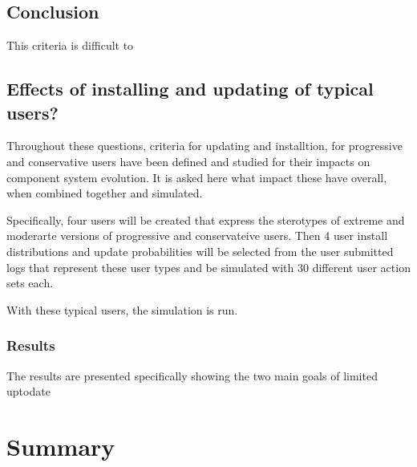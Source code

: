 \subsection{Conclusion}
This criteria is difficult to 

\subsection{Effects of installing and updating of typical users?}
Throughout these questions, criteria for updating and installtion, for progressive and conservative users have been defined and studied for their impacts on component system evolution.
It is asked here what impact these have overall, when combined together and simulated.

Specifically, four users will be created that express the sterotypes of extreme and moderarte versions of progressive and conservateive users.
Then 4 user install distributions and update probabilities will be selected from the user submitted logs that represent these user types and be simulated with 30 different user action sets each.

With these typical users, the simulation is run.
\subsubsection{Results}
The results are presented specifically showing the two main goals of limited uptodate

\section{Summary}
